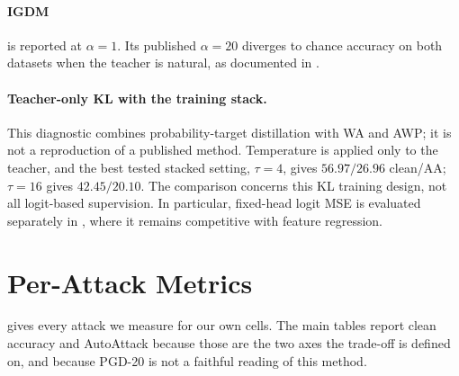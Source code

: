 \paragraph{IGDM} is reported at $\alpha = 1$. Its published $\alpha = 20$ diverges to chance accuracy
on both datasets when the teacher is natural, as documented in .

\paragraph{Teacher-only KL with the training stack.} This diagnostic combines probability-target
distillation with WA and AWP; it is not a reproduction of a published method. Temperature is applied
only to the teacher, and the best tested stacked setting, $\tau=4$, gives $56.97/26.96$ clean/AA;
$\tau=16$ gives $42.45/20.10$. The comparison concerns this KL training design, not all logit-based
supervision. In particular, fixed-head logit MSE is evaluated separately in
, where it remains competitive with feature regression.

\section{Per-Attack Metrics}
\label{app:fullmetrics}

 gives every attack we measure for our own cells. The main tables report clean
accuracy and AutoAttack because those are the two axes the trade-off is defined on, and because
PGD-20 is not a faithful reading of this method.

